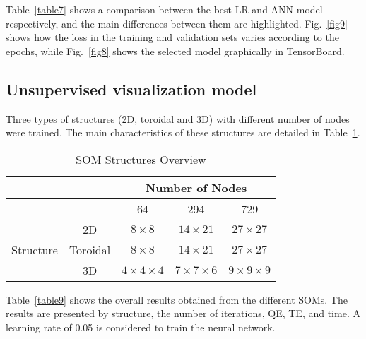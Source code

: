 \documentclass[conference]{IEEEtran}
\begin{document}
Table~\ref{table7} shows a comparison between the best LR and ANN model respectively, and the main differences between them are highlighted. Fig.~\ref{fig9} shows how the loss in the training and validation sets varies according to the epochs, while Fig.~\ref{fig8} shows the selected model graphically in TensorBoard. 

\subsection{Unsupervised visualization model}

Three types of structures (2D, toroidal and 3D) with different number of nodes were trained. The main characteristics of these structures are detailed in Table~\ref{table8}.

\begin{table}[!ht]
\renewcommand{\arraystretch}{1.3}
\caption{SOM Structures Overview}
\label{table8}
\centering
\begin{tabular}{c | c || c | c | c }
\hline
	&	&  \multicolumn{3}{c}{Number of Nodes} \\ 
\hline
	&	&  64 	&	294	&	729	\\ 	
\hline\hline
\multirow{3}{*}{Structure}		& 	2D		&  $8\times8$	&	$14\times21$	&	$27\times27$	\\ 	
				&	Toroidal	&  $8\times8$	&	$14\times21$	&	$27\times27$	\\ 
				&	3D		&  $4\times4\times4 $		&	$7\times7\times6 $	&	$9\times9\times9 $	\\ 		

\hline
\end{tabular}
\end{table}

Table~\ref{table9} shows the overall results obtained from the different SOMs. The results are presented by structure, the number of iterations, QE, TE, and time. A learning rate of 0.05 is considered to train the neural network.
\end{document}
